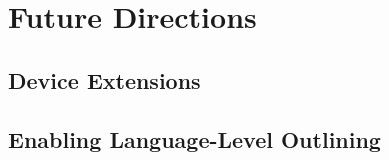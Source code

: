 \section{Future Directions}
\label{sec:future_directions}

\subsection{Device Extensions}
\label{sub:device_extensions}

\subsection{Enabling Language-Level Outlining}
\label{sub:enabling_language_level_outlining}


